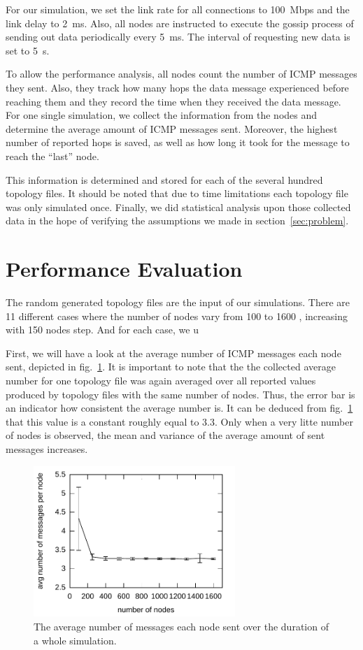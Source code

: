 \documentclass[12pt,journal]{IEEEtran}
\begin{document}
For our simulation, we set the link rate for all connections to 100~Mbps and the link delay to 2~ms. Also, all nodes are instructed to execute the gossip process of sending out data periodically every 5~ms. The interval of requesting new data is set to 5~s.

To allow the performance analysis, all nodes count the number of ICMP messages they sent. Also, they track how many hops the data message experienced before reaching them and they record the time when they received the data message. For one single simulation, we collect the information from the nodes and determine the average amount of ICMP messages sent. Moreover, the highest number of reported hops is saved, as well as how long it took for the message to reach the ``last'' node.

This information is determined and stored for each of the several hundred topology files. It should be noted that due to time limitations each topology file was only simulated once. Finally, we did statistical analysis upon those collected data in the hope of verifying the assumptions we made in section~\ref{sec:problem}.

\section{Performance Evaluation}
The random generated topology files are the input of our simulations. There are 11 different cases where the number of nodes vary from 100 to 1600 , increasing with 150 nodes step. And for each case, we u


First, we will have a look at the average number of ICMP messages each node sent, depicted in fig.~\ref{fig:avgmsg}. It is important to note that the the collected average number for one topology file was again averaged over all reported values produced by topology files with the same number of nodes. Thus, the error bar is an indicator how consistent the average number is. It can be deduced from fig.~\ref{fig:avgmsg} that this value is a constant roughly equal to 3.3. Only when a very litte number of nodes is observed, the mean and variance of the average amount of sent messages increases.

\begin{figure}
	\centering
	\includegraphics[width=3in]{figs/avgmsg}
	\caption{The average number of messages each node sent over the duration of a whole simulation.}
	\label{fig:avgmsg}
\end{figure}
\end{document}
